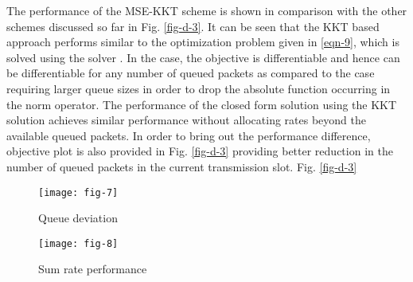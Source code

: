 The performance of the \ac{MSE}-\ac{KKT} scheme is shown in comparison with the other schemes discussed so far in Fig. \ref{fig-d-3}. It can be seen that the \ac{KKT} based approach performs similar to the optimization problem given in \eqref{eqn-9}, which is solved using the solver \cite{grant2008cvx}. In the  case, the objective is differentiable and hence can be differentiable for any number of queued packets as compared to the  case requiring larger queue sizes in order to drop the absolute function occurring in the norm operator. The performance of the closed form solution using the \ac{KKT} solution achieves similar performance without allocating rates beyond the available queued packets. In order to bring out the performance difference,  objective plot is also provided in Fig. \ref{fig-d-3} providing better reduction in the number of queued packets in the current transmission slot.
Fig. \ref{fig-d-3}
\begin{figure*}
\centering
\begin{subfigure}{0.49\textwidth}
\texttt{[image: fig-7]}
\caption{Queue deviation}
\end{subfigure}
\hfill
\begin{subfigure}{0.49\textwidth}
\texttt{[image: fig-8]}
\caption{Sum rate performance}
\end{subfigure}
\caption{Convergence plot for  model}
\label{fig-d-3}
\end{figure*}
